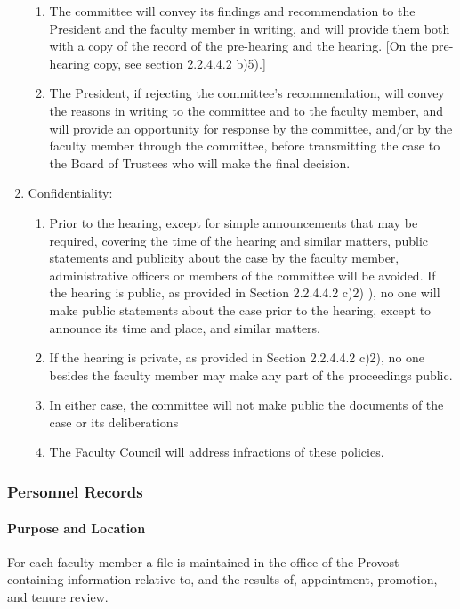 \documentclass[letterpaper, 11pt]{article}
\begin{document}
\begin{enumerate}[label=\alph*)]
{\begin{enumerate}[label=\arabic*)]
							\item{The committee will convey its findings and recommendation to the President and the faculty member in writing, and will provide them both with a copy of the record of the pre-hearing and the hearing.  [On the pre-hearing copy, see section 2.2.4.4.2 b)5).]}
							\item{The President, if rejecting the committee's recommendation, will convey the reasons in writing to the committee and to the faculty member, and will provide an opportunity for response by the committee, and/or by the faculty member through the committee, before transmitting the case to the Board of Trustees who will make the final decision.}
						\end{enumerate}
					}
					\item{Confidentiality:
						\begin{enumerate}[label=\arabic*)]
							\item{Prior to the hearing, except for simple announcements that may be required, covering the time of the hearing and similar matters, public statements and publicity about the case by the faculty member, administrative officers or members of the committee will be avoided.  If the hearing is public, as provided in Section 2.2.4.4.2 c)2) ), no one will make public statements about the case prior to the hearing, except to announce its time and place, and similar matters.}
							\item{If the hearing is private, as provided in Section 2.2.4.4.2 c)2), no one besides the faculty member may make any part of the proceedings public.}
							\item{In either case, the committee will not make public the documents of the case or its deliberations}
							\item{The Faculty Council will address infractions of these policies.}
						\end{enumerate}
					}
				\end{enumerate}
		\subsubsection{Personnel Records}
			\paragraph{Purpose and Location}
				For each faculty member a file is maintained in the office of the Provost containing information relative to, and the results of, appointment, promotion, and tenure review.
\end{document}
